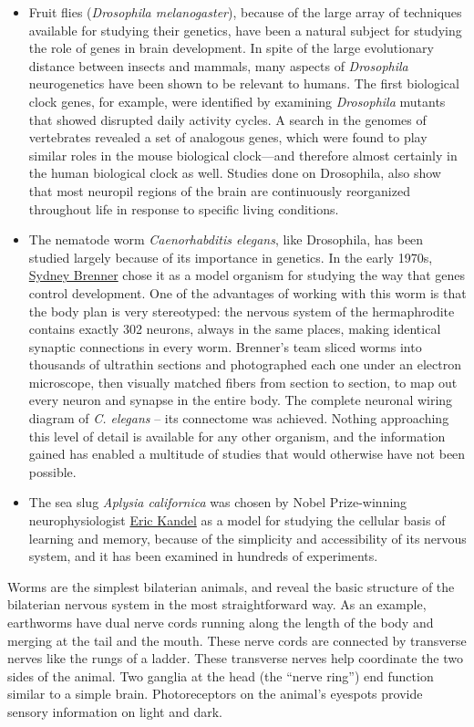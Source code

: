 \begin{itemize}
\tightlist
\item
  Fruit flies (\emph{Drosophila melanogaster}), because of the large array of techniques available for studying their genetics, have been a natural subject for studying the role of genes in brain development. In spite of the large evolutionary distance between insects and mammals, many aspects of \emph{Drosophila} neurogenetics have been shown to be relevant to humans. The first biological clock genes, for example, were identified by examining \emph{Drosophila} mutants that showed disrupted daily activity cycles. A search in the genomes of vertebrates revealed a set of analogous genes, which were found to play similar roles in the mouse biological clock---and therefore almost certainly in the human biological clock as well. Studies done on Drosophila, also show that most neuropil regions of the brain are continuously reorganized throughout life in response to specific living conditions.
\item
  The nematode worm \emph{Caenorhabditis elegans}, like Drosophila, has been studied largely because of its importance in genetics. In the early 1970s, \href{https://en.wikipedia.org/wiki/Sydney_Brenner}{Sydney Brenner} chose it as a model organism for studying the way that genes control development. One of the advantages of working with this worm is that the body plan is very stereotyped: the nervous system of the hermaphrodite contains exactly 302 neurons, always in the same places, making identical synaptic connections in every worm. Brenner's team sliced worms into thousands of ultrathin sections and photographed each one under an electron microscope, then visually matched fibers from section to section, to map out every neuron and synapse in the entire body. The complete neuronal wiring diagram of \emph{C. elegans} -- its connectome was achieved. Nothing approaching this level of detail is available for any other organism, and the information gained has enabled a multitude of studies that would otherwise have not been possible.
\item
  The sea slug \emph{Aplysia californica} was chosen by Nobel Prize-winning neurophysiologist \href{https://en.wikipedia.org/wiki/Eric_Kandel}{Eric Kandel} as a model for studying the cellular basis of learning and memory, because of the simplicity and accessibility of its nervous system, and it has been examined in hundreds of experiments.
\end{itemize}

Worms are the simplest bilaterian animals, and reveal the basic structure of the bilaterian nervous system in the most straightforward way. As an example, earthworms have dual nerve cords running along the length of the body and merging at the tail and the mouth. These nerve cords are connected by transverse nerves like the rungs of a ladder. These transverse nerves help coordinate the two sides of the animal. Two ganglia at the head (the ``nerve ring'') end function similar to a simple brain. Photoreceptors on the animal's eyespots provide sensory information on light and dark.

